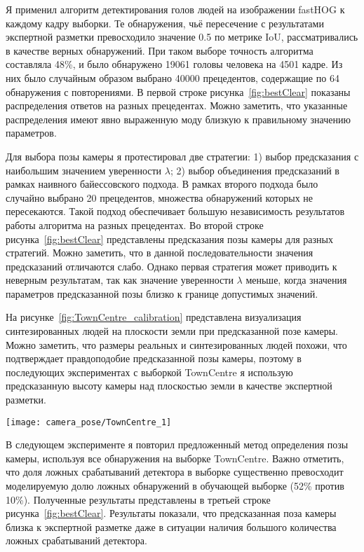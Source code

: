 Я применил алгоритм детектирования голов людей на изображении fastHOG \cite{prisacariu_reid_tr2310_09} к каждому кадру выборки. Те обнаружения, чьё пересечение с результатами экспертной разметки превосходило значение 0.5 по метрике IoU, рассматривались в качестве верных обнаружений. При таком выборе точность алгоритма составляла 48\%, и было обнаружено 19061 головы человека на 4501 кадре. Из них было случайным образом выбрано 40000 прецедентов, содержащие по 64 обнаружения с повторениями. В первой строке рисунка~\ref{fig:bestClear} показаны распределения ответов на разных прецедентах. Можно заметить, что указанные распределения имеют явно выраженную моду близкую к правильному значению параметров.

Для выбора позы камеры я протестировал две стратегии: 1) выбор предсказания с наибольшим значением уверенности $\lambda$; 2) выбор объединения предсказаний в рамках наивного байессовского подхода. В рамках второго подхода было случайно выбрано 20 прецедентов, множества обнаружений которых не пересекаются. Такой подход обеспечивает большую независимость результатов работы алгоритма на разных прецедентах. Во второй строке рисунка~\ref{fig:bestClear} представлены предсказания позы камеры для разных стратегий. Можно заметить, что в данной последовательности значения предсказаний отличаются слабо. Однако первая стратегия может приводить к неверным результатам, так как значение уверенности $\lambda$ меньше, когда значения параметров предсказанной позы близко к границе допустимых значений.

На рисунке~\ref{fig:TownCentre_calibration} представлена визуализация синтезированных людей на плоскости земли при предсказанной позе камеры. Можно заметить, что размеры реальных и синтезированных людей похожи, что подтверждает правдоподобие предсказанной позы камеры, поэтому в последующих экспериментах с выборкой TownCentre я использую предсказанную высоту камеры над плоскостью земли в качестве экспертной разметки.

\begin{figure*}[!t]
	\centering
	\texttt{[image: camera\_pose/TownCentre\_1]}
	\caption{Визуализация синтезированных людей на предсказанной плоскости земли.}
	\label{fig:TownCentre_calibration}
\end{figure*}

В следующем эксперименте я повторил предложенный метод определения позы камеры, используя все обнаружения на выборке TownCentre. Важно отметить, что доля ложных срабатываний детектора в выборке существенно превосходит моделируемую долю ложных обнаружений в обучающей выборке (52\% против 10\%). Полученные результаты представлены в третьей строке рисунка~\ref{fig:bestClear}. Результаты показали, что предсказанная поза камеры близка к экспертной разметке даже в ситуации наличия большого количества ложных срабатываний детектора.

